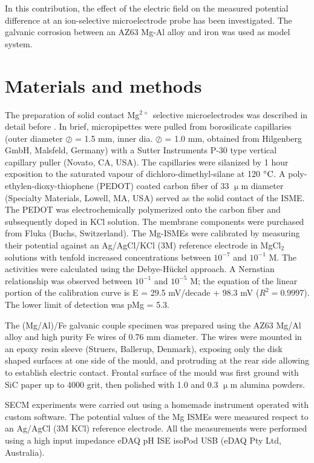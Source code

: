 \documentclass[3p]{elsarticle}
\begin{document}
In this contribution, the effect of the electric field on the measured potential difference at an ion-selective microelectrode probe has been investigated. The galvanic corrosion between an AZ63 Mg-Al alloy and iron was used as model system.

\section{Materials and methods}

The preparation of solid contact Mg$^{2+}$ selective microelectrodes was described in detail before \cite{overmg3}. In brief, micropipettes were pulled from borosilicate capillaries (outer diameter $\oslash$ = 1.5 mm, inner dia. $\oslash$ = 1.0 mm, obtained from Hilgenberg GmbH, Malsfeld, Germany) with a Sutter Instruments P-30 type vertical capillary puller (Novato, CA, USA). The capillaries were silanized by 1 hour exposition to the saturated vapour of dichloro-dimethyl-silane at 120 $\celsius$. A poly-ethylen-dioxy-thiophene (PEDOT) coated carbon fiber of 33 $\upmu$m diameter (Specialty Materials, Lowell, MA, USA) served as the solid contact of the ISME. The PEDOT was electrochemically polymerized onto the carbon fiber and subsequently doped in KCl solution. The membrane components were purchased from Fluka (Buchs, Switzerland).
The Mg-ISMEs were calibrated by measuring their potential against an Ag/AgCl/KCl (3M) reference electrode in MgCl$_2$ solutions with tenfold increased concentrations between $10^{-7}$ and $10^{-1}$ M. The activities were calculated using the Debye-Hückel approach. A Nernstian relationship was observed between $10^{-1}$ and $10^{-5}$ M; the equation of the linear portion of the calibration curve is E = 29.5 mV/decade + 98.3 mV ($R^2=0.9997$). The lower limit of detection was pMg = 5.3.

The (Mg/Al)/Fe galvanic couple specimen was prepared using the AZ63 Mg/Al alloy and high purity Fe wires of 0.76 mm diameter. The wires were mounted in an epoxy resin sleeve (Struers, Ballerup, Denmark), exposing only the disk shaped surfaces at one side of the mould, and protruding at the rear side allowing to establish electric contact. Frontal surface of the mould was first ground with SiC paper up to 4000 grit, then polished with 1.0 and 0.3 $\upmu$m alumina powders.

SECM experiments were carried out using a homemade instrument operated with custom software. The potential values of the Mg ISMEs were measured respect to an Ag/AgCl (3M KCl) reference electrode. All the measurements were performed using a high input impedance eDAQ pH ISE isoPod USB (eDAQ Pty Ltd, Australia).
\end{document}
